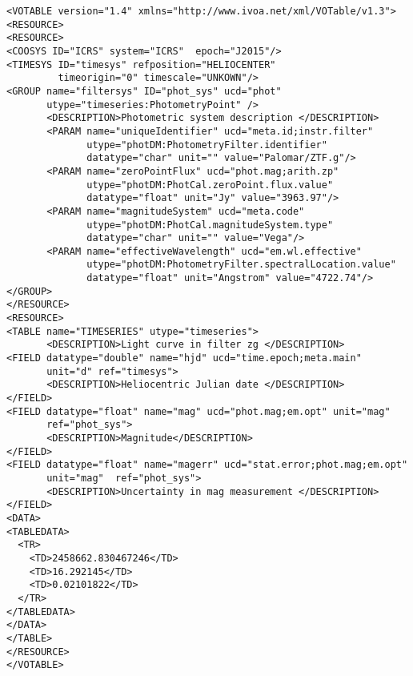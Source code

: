 \noindent
\begingroup\footnotesize
\begin{tcolorbox}
\begin{verbatim}
<VOTABLE version="1.4" xmlns="http://www.ivoa.net/xml/VOTable/v1.3">
<RESOURCE>
<RESOURCE>
<COOSYS ID="ICRS" system="ICRS"  epoch="J2015"/>
<TIMESYS ID="timesys" refposition="HELIOCENTER" 
         timeorigin="0" timescale="UNKOWN"/>
<GROUP name="filtersys" ID="phot_sys" ucd="phot" 
       utype="timeseries:PhotometryPoint" /> 
       <DESCRIPTION>Photometric system description </DESCRIPTION>
       <PARAM name="uniqueIdentifier" ucd="meta.id;instr.filter" 
              utype="photDM:PhotometryFilter.identifier" 
              datatype="char" unit="" value="Palomar/ZTF.g"/>
       <PARAM name="zeroPointFlux" ucd="phot.mag;arith.zp" 
              utype="photDM:PhotCal.zeroPoint.flux.value" 
              datatype="float" unit="Jy" value="3963.97"/>
       <PARAM name="magnitudeSystem" ucd="meta.code" 
              utype="photDM:PhotCal.magnitudeSystem.type" 
              datatype="char" unit="" value="Vega"/>
       <PARAM name="effectiveWavelength" ucd="em.wl.effective" 
              utype="photDM:PhotometryFilter.spectralLocation.value" 
              datatype="float" unit="Angstrom" value="4722.74"/>
</GROUP>
</RESOURCE>
<RESOURCE>
<TABLE name="TIMESERIES" utype="timeseries">
       <DESCRIPTION>Light curve in filter zg </DESCRIPTION>
<FIELD datatype="double" name="hjd" ucd="time.epoch;meta.main" 
       unit="d" ref="timesys">
       <DESCRIPTION>Heliocentric Julian date </DESCRIPTION>
</FIELD>
<FIELD datatype="float" name="mag" ucd="phot.mag;em.opt" unit="mag" 
       ref="phot_sys">
       <DESCRIPTION>Magnitude</DESCRIPTION>
</FIELD>
<FIELD datatype="float" name="magerr" ucd="stat.error;phot.mag;em.opt" 
       unit="mag"  ref="phot_sys">
       <DESCRIPTION>Uncertainty in mag measurement </DESCRIPTION>
</FIELD>
<DATA>  
<TABLEDATA>
  <TR>
    <TD>2458662.830467246</TD>
    <TD>16.292145</TD>
    <TD>0.02101822</TD>
  </TR>
</TABLEDATA>
</DATA>
</TABLE>
</RESOURCE>
</VOTABLE>
\end{verbatim}
\end{tcolorbox}
\endgroup
